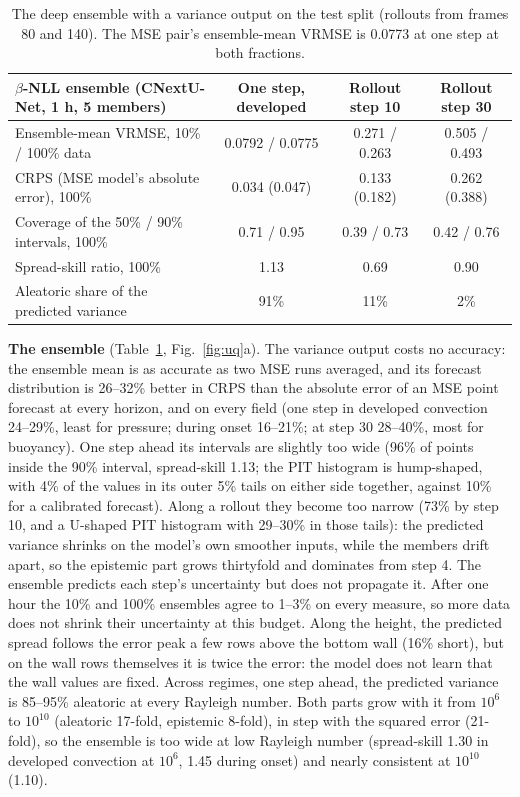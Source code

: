 \documentclass[11pt]{article}
\begin{document}
\begin{table}[!htbp]
\centering\small
\begin{tabular}{@{}lccc@{}}
\toprule
$\beta$-NLL ensemble (CNextU-Net, 1 h, 5 members) & One step, developed & Rollout step 10 & Rollout step 30 \\
\midrule
Ensemble-mean VRMSE, 10\% / 100\% data & 0.0792 / 0.0775 & 0.271 / 0.263 & 0.505 / 0.493 \\
CRPS (MSE model's absolute error), 100\% & 0.034 (0.047) & 0.133 (0.182) & 0.262 (0.388) \\
Coverage of the 50\% / 90\% intervals, 100\% & 0.71 / 0.95 & 0.39 / 0.73 & 0.42 / 0.76 \\
Spread-skill ratio, 100\% & 1.13 & 0.69 & 0.90 \\
Aleatoric share of the predicted variance & 91\% & 11\% & 2\% \\
\bottomrule
\end{tabular}
\caption{The deep ensemble with a variance output on the test split (rollouts from frames 80 and 140). The MSE pair's
ensemble-mean VRMSE is 0.0773 at one step at both fractions.}
\label{tab:uqa}
\end{table}

\textbf{The ensemble} (Table~\ref{tab:uqa}, Fig.~\ref{fig:uq}a). The variance output costs no accuracy: the
ensemble mean is as accurate as two MSE runs averaged, and its forecast distribution is 26--32\% better in CRPS than the
absolute error of an MSE point forecast at every horizon, and on every field (one step in developed convection 24--29\%,
least for pressure; during onset 16--21\%; at step 30 28--40\%, most for buoyancy). One step ahead its intervals are slightly too wide (96\% of
points inside the 90\% interval, spread-skill 1.13; the PIT histogram is hump-shaped, with 4\% of the values in its
outer 5\% tails on either side together, against 10\% for a calibrated forecast). Along a rollout they become too
narrow (73\% by step 10, and a U-shaped PIT histogram with 29--30\% in those tails): the
predicted variance shrinks on the model's own smoother inputs, while the members drift apart, so the epistemic part
grows thirtyfold and dominates from step 4. The ensemble predicts each step's uncertainty but does not propagate it.
After one hour the 10\% and 100\% ensembles agree to 1--3\% on every measure, so more data does not shrink their
uncertainty at this budget. Along the height, the predicted spread follows the error peak a few rows above the bottom
wall (16\% short), but on the wall rows themselves it is twice the error: the model does not learn that the wall values
are fixed. Across regimes, one step ahead, the predicted variance is 85--95\% aleatoric at every Rayleigh number. Both
parts grow with it from $10^6$ to $10^{10}$ (aleatoric 17-fold, epistemic 8-fold), in step with the squared error
(21-fold), so the ensemble is too wide at low Rayleigh number (spread-skill 1.30 in developed convection at $10^6$,
1.45 during onset) and nearly consistent at $10^{10}$ (1.10).
\end{document}
